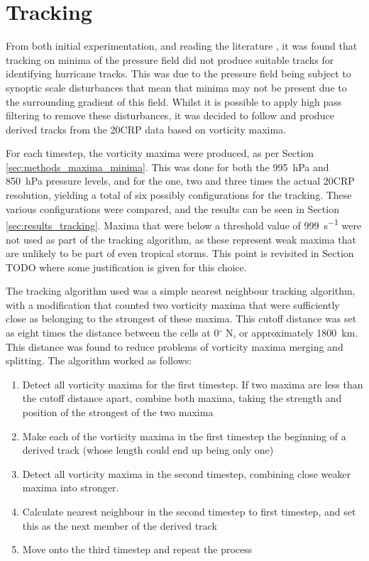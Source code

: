 \documentclass[pdftex,12pt,a4paper]{report}
\renewcommand{\textdegree}{$^{\circ}$ }
\begin{document}
\section{Tracking}

From both initial experimentation, and reading the literature \parencite{TODOmultiple}, it was found
that tracking on minima of the pressure field did not produce suitable tracks for identifying
hurricane tracks. This was due to the pressure field being subject to synoptic scale disturbances
that mean that minima may not be present due to the surrounding gradient of this field. Whilst it is
possible to apply high pass filtering to remove these disturbances, it was decided to follow
\textcite{TODOmutliple} and produce derived tracks from the 20CRP data based on vorticity maxima.

For each timestep, the vorticity maxima were produced, as per Section
\ref{sec:methods_maxima_minima}. This was done for both the \SI{995}{hPa} and \SI{850}{hPa} pressure
levels, and for the one, two and three times the actual 20CRP resolution, yielding a total of six
possibly configurations for the tracking. These various configurations were compared, and the
results can be seen in Section \ref{sec:results_tracking}. Maxima that were below a threshold value
of \SI{999}{s^{-1}} were not used as part of the tracking algorithm, as these represent weak maxima
that are unlikely to be part of even tropical storms. This point is revisited in Section TODO where
some justification is given for this choice.

The tracking algorithm used was a simple nearest neighbour tracking algorithm, with a modification
that counted two vorticity maxima that were sufficiently close as belonging to the strongest of
these maxima. This cutoff distance was set as eight times the distance between the cells at
0\textdegree N, or approximately \SI{1800}{km}. This distance was found to reduce problems of
vorticity maxima merging and splitting. The algorithm worked as follows:

\begin{enumerate}
    \item Detect all vorticity maxima for the first timestep. If two maxima are less than the cutoff
        distance apart, combine both maxima, taking the strength and position of the strongest of
        the two maxima
    \item Make each of the vorticity maxima in the first timestep the beginning of a derived track
        (whose length could end up being only one)
    \item Detect all vorticity maxima in the second timestep, combining close weaker maxima into
        stronger.
    \item Calculate nearest neighbour in the second timestep to first timestep, and set this as the
        next member of the derived track
    \item Move onto the third timestep and repeat the process
\end{enumerate}
\end{document}
